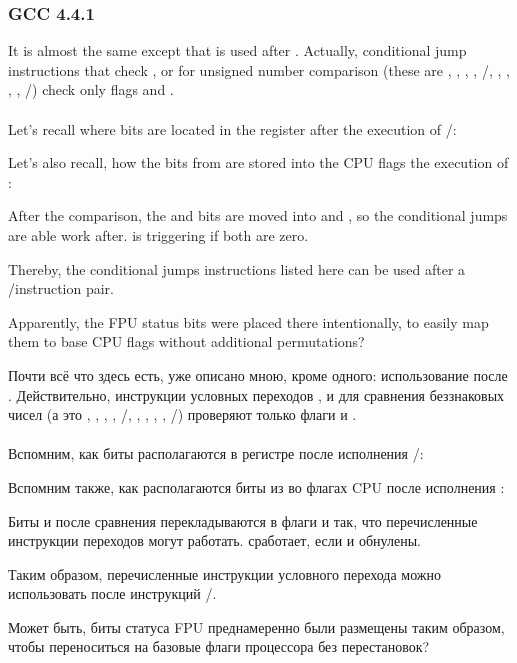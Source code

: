 \subsubsection{\Optimizing GCC 4.4.1}




\ifdefined\ENGLISH
It is almost the same except that \JA is used after \SAHF. 
Actually, conditional jump instructions that check ,  or  for unsigned number comparison 
(these are \JA, \JAE, \JB, \JBE, \JE/\JZ, \JNA, \JNAE, \JNB, \JNBE, \JNE/\JNZ) check only flags \CF and \ZF.\\
\\
Let's recall where bits \CThreeBits are located in the  register after the execution of /\FNSTSW:



Let's also recall, how the bits from  are stored into the CPU flags the execution of \SAHF:



After the comparison, the \Cthree and \Czero bits are moved into \ZF and \CF, so the conditional jumps are able work after. \JA is triggering if both \CF are \ZF zero.

Thereby, the conditional jumps instructions listed here can be used after a \FNSTSW/\SAHF instruction pair.

Apparently, the FPU \CThreeBits status bits were placed there intentionally, to easily map them to base CPU flags without additional permutations?
\fi %

\ifdefined\RUSSIAN
Почти всё что здесь есть, уже описано мною, кроме одного: использование \JA после \SAHF. 
Действительно, инструкции условных переходов ,  и  для сравнения беззнаковых чисел 
(а это \JA, \JAE, \JB, \JBE, \JE/\JZ, \JNA, \JNAE, \JNB, \JNBE, \JNE/\JNZ) проверяют только флаги \CF и \ZF.\\
\\
Вспомним, как биты \CThreeBits располагаются в регистре  после исполнения /\FNSTSW:



Вспомним также, как располагаются биты из  во флагах CPU после исполнения \SAHF:



Биты \Cthree и \Czero после сравнения перекладываются в флаги \ZF и \CF так, что перечисленные инструкции переходов могут работать. \JA сработает, если \CF и \ZF обнулены.

Таким образом, перечисленные инструкции условного перехода можно использовать после инструкций \FNSTSW/\SAHF.

Может быть, биты статуса FPU \CThreeBits преднамеренно были размещены таким образом, чтобы переноситься на базовые флаги процессора без перестановок?
\fi %

